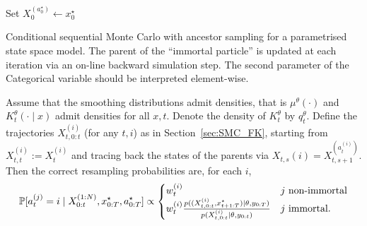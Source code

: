 \begin{algorithm}[ht]
\vspace*{10pt}
\DontPrintSemicolon
{}
Set $X_0^{(a_0^\star)} \gets x_0^\star$\;
\vspace*{10pt}
\caption[Conditional sequential Monte Carlo with ancestor sampling]{Conditional sequential Monte Carlo with ancestor sampling for a parametrised state space model. The parent of the ``immortal particle'' is updated at each iteration via an on-line backward simulation step. The second parameter of the Categorical variable should be interpreted element-wise.}
\label{alg:condSMC_ancsamp}
\end{algorithm}
Assume that the smoothing distributions admit densities, that is $\mu^\theta(\cdot)$ and $K_t^\theta(\cdot\mid x)$ admit densities for all $x,t$. Denote the density of $K_t^\theta$ by $q_t^\theta$. Define the trajectories $X_{t, 0:t}^{(i)}$ (for any $t,i$) as in Section~\ref{sec:SMC_FK}, starting from $X_{t,t}^{(i)} := X_t^{(i)}$ and tracing back the states of the parents via $X_{t,s}{(i)} = X_{t,s+1}^{( a_t^{(i)} )}$.
Then the correct resampling probabilities are, for each $i$,
\begin{equation}\label{eq:ancsamp_probs}
\mathbb{P}[a_t^{(j)} = i \mid X_{0:t}^{(1:N)}, x_{0:T}^\star, a_{0:T}^\star ] 
\propto \begin{cases}
w_t^{(i)} & j \text{ non-immortal}\\
w_t^{(i)} \frac{
        p( (X_{t,0:t}^{(i)}, x_{t+1:T}^\star) \mid \theta, y_{0:T} )}
        {p( X_{t,0:t}^{(i)} \mid \theta, y_{0:t} ) } 
        & j \text{ immortal} .
\end{cases}
\end{equation}
